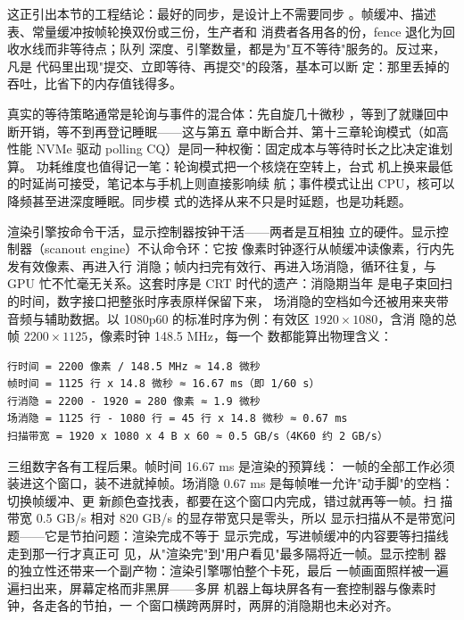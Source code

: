 
这正引出本节的工程结论：最好的同步，是设计上不需要同步
。帧缓冲、描述表、常量缓冲按帧轮换双份或三份，生产者和
消费者各用各的份，fence 退化为回收水线而非等待点；队列
深度、引擎数量，都是为"互不等待"服务的。反过来，凡是
代码里出现"提交、立即等待、再提交"的段落，基本可以断
定：那里丢掉的吞吐，比省下的内存值钱得多。

真实的等待策略通常是轮询与事件的混合体：先自旋几十微秒
，等到了就赚回中断开销，等不到再登记睡眠——这与第五
章中断合并、第十三章轮询模式（如高性能 NVMe 驱动 polling
CQ）是同一种权衡：固定成本与等待时长之比决定谁划算。
功耗维度也值得记一笔：轮询模式把一个核烧在空转上，台式
机上换来最低的时延尚可接受，笔记本与手机上则直接影响续
航；事件模式让出 CPU，核可以降频甚至进深度睡眠。同步模
式的选择从来不只是时延题，也是功耗题。

渲染引擎按命令干活，显示控制器按钟干活——两者是互相独
立的硬件。显示控制器（scanout engine）不认命令环：它按
像素时钟逐行从帧缓冲读像素，行内先发有效像素、再进入行
消隐；帧内扫完有效行、再进入场消隐，循环往复，与 GPU
忙不忙毫无关系。这套时序是 CRT 时代的遗产：消隐期当年
是电子束回扫的时间，数字接口把整张时序表原样保留下来，
场消隐的空档如今还被用来夹带音频与辅助数据。以
1080p60 的标准时序为例：有效区 $1920\times1080$，含消
隐的总帧 $2200\times1125$，像素时钟 148.5 MHz，每一个
数都能算出物理含义：

\begin{lstlisting}
行时间 = 2200 像素 / 148.5 MHz ≈ 14.8 微秒
帧时间 = 1125 行 x 14.8 微秒 ≈ 16.67 ms（即 1/60 s）
行消隐 = 2200 - 1920 = 280 像素 ≈ 1.9 微秒
场消隐 = 1125 行 - 1080 行 = 45 行 x 14.8 微秒 ≈ 0.67 ms
扫描带宽 = 1920 x 1080 x 4 B x 60 ≈ 0.5 GB/s（4K60 约 2 GB/s）
\end{lstlisting}

三组数字各有工程后果。帧时间 16.67 ms 是渲染的预算线：
一帧的全部工作必须装进这个窗口，装不进就掉帧。场消隐
0.67 ms 是每帧唯一允许"动手脚"的空档：切换帧缓冲、更
新颜色查找表，都要在这个窗口内完成，错过就再等一帧。扫
描带宽 0.5 GB/s 相对 820 GB/s 的显存带宽只是零头，所以
显示扫描从不是带宽问题——它是节拍问题：渲染完成不等于
显示完成，写进帧缓冲的内容要等扫描线走到那一行才真正可
见，从"渲染完"到"用户看见"最多隔将近一帧。显示控制
器的独立性还带来一个副产物：渲染引擎哪怕整个卡死，最后
一帧画面照样被一遍遍扫出来，屏幕定格而非黑屏——多屏
机器上每块屏各有一套控制器与像素时钟，各走各的节拍，一
个窗口横跨两屏时，两屏的消隐期也未必对齐。


